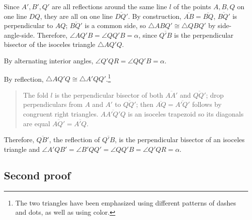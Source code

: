 Since $A', B', Q'$ are all reflections around the same line $l$ of the points $A,B,Q$ on one line $DQ$, they are all on one line $\overline{DQ'}$. By construction, $\overline{AB}=\overline{BQ}$, $\overline{BQ'}$ is perpendicular to $AQ$; $\overline{BQ'}$ is a common side, so $\triangle ABQ'\cong \triangle QBQ'$ by side-angle-side. Therefore, $\angle AQ'B=\angle QQ'B=\alpha$, since $\overline{Q'B}$ is the perpendicular bisector of the isoceles triangle $\triangle AQ'Q$.

By alternating interior angles, $\angle Q'QR=\angle QQ'B=\alpha$.

By reflection, $\triangle AQ'Q\cong \triangle A'QQ'$.\footnote{The two triangles have been emphasized using different patterns of dashes and dots, as well as using color.}
\begin{quote}
The fold $l$ is the perpendicular bisector of both $\overline{AA'}$ and $\overline{QQ'}$; drop perpendiculars from $A$ and $A'$ to $\overline{QQ'}$; then $\overline{AQ}=\overline{A'Q'}$ follows by congruent right triangles. $\overline{AA'Q'Q}$ is an isoceles trapezoid so its diagonals are equal $\overline{AQ'}=\overline{A'Q}$.
\end{quote}
Therefore, $\overline{QB'}$, the reflection of $\overline{Q'B}$, is the perpendicular bisector of an isoceles triangle and $\angle A'QB'=\angle B'QQ'=\angle QQ'B=\angle Q'QR=\alpha$.


\subsection{Second proof}

